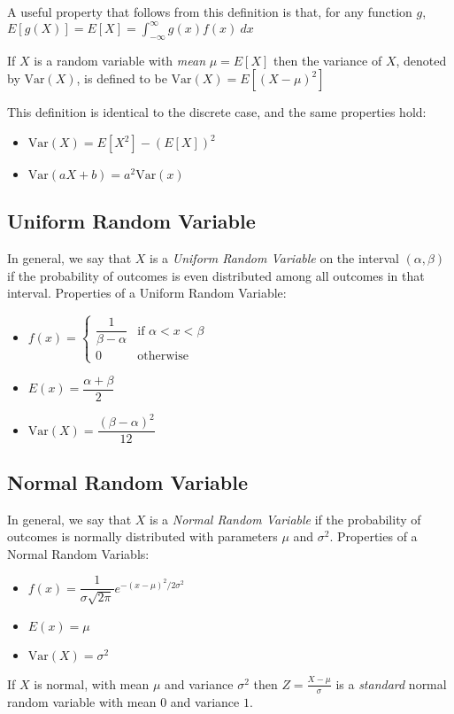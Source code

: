 \documentclass[10pt]{article}
\begin{document}
		A useful property that follows from this definition is that, for any function $g$, $E[g(X)]=E[X] = \int_{-\infty}^{\infty} g(x)f(x)\:dx$ 
		
		If $X$ is a random variable with \emph{mean} $\mu=E[X]$ then the variance of $X$, denoted by $\text{Var}(X)$, is defined to be $\text{Var}(X) = E[(X-\mu)^2]$
		
		This definition is identical to the discrete case, and the same properties hold:
		\begin{multicols}{2}
			\begin{itemize}
				\item $\text{Var}(X) = E[X^2] - (E[X])^2$
				\item $\text{Var}(aX + b) = a^2 \text{Var}(x)$
			\end{itemize}
		\end{multicols}
		
		\subsection*{Uniform Random Variable}
		In general, we say that $X$ is a \emph{Uniform Random Variable} on the interval $(\alpha, \beta)$ if the probability of outcomes is even distributed among all outcomes in that interval. Properties of a Uniform Random Variable:
		\begin{multicols}{3}
			\begin{itemize}
				\item $f(x) = 
					\begin{cases} 
						\dfrac{1}{\beta - \alpha} & \text{if } \alpha < x < \beta\\
						0 & \text{otherwise}
					\end{cases}$
				\item $E(x) = \dfrac{\alpha + \beta}{2}$
				\item $\text{Var}(X) = \dfrac{(\beta-\alpha)^2}{12}$
			\end{itemize}
		\end{multicols}
		
		\subsection*{Normal Random Variable}
		In general, we say that $X$ is a \emph{Normal Random Variable} if the probability of outcomes is normally distributed with parameters \(\mu\) and \(\sigma^2\). Properties of a Normal Random Variabls:
		\begin{multicols}{3}
			\begin{itemize}
				\item $f(x) = \dfrac{1}{\sigma\sqrt{2\pi}}e^{-(x-\mu)^2 / 2\sigma^2}$
				\item $E(x) = \mu$
				\item $\text{Var}(X) = \sigma^2$
			\end{itemize}
		\end{multicols}
		If \(X\) is normal, with mean \(\mu\) and variance \(\sigma^2\) then $Z=\frac{X-\mu}{\sigma}$ is a \emph{standard} normal random variable with mean \(0\) and variance \(1\).
		
\end{document}
